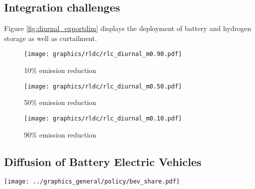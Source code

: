 \subsection{Integration challenges}


Figure \ref{fig:diurnal_exportdim} displays the deployment of battery and hydrogen storage as well as curtailment.

\begin{figure*}[t] %
    \centering
    \begin{subfigure}[b]{0.3\linewidth}
        \centering
        \texttt{[image: graphics/rldc/rlc\_diurnal\_m0.90.pdf]}
        \caption{10\% emission reduction}
        \label{fig:diurnal_10emred}
    \end{subfigure}
    \hfill
    \begin{subfigure}[b]{0.3\linewidth}
        \centering
        \texttt{[image: graphics/rldc/rlc\_diurnal\_m0.50.pdf]}
        \caption{50\% emission reduction}
        \label{fig:diurnal_50emred}
    \end{subfigure}
    \hfill
    \begin{subfigure}[b]{0.3\linewidth}
        \centering
        \texttt{[image: graphics/rldc/rlc\_diurnal\_m0.10.pdf]}
        \caption{90\% emission reduction}
        \label{fig:diurnal_90emred}
    \end{subfigure}
    \hfill
    \caption{Export dependent (0 - 200 TWh) residual load curves with various integration options. Each row represents different integration strategies (RLC without integration, RLC with curtailment, RLC with curtailment and electrolyser load).
    Each column represents different climate ambitions (10 - 90\% emission reduction)}
    \label{fig:diurnal_exportdim}
\end{figure*}

\subsection{Diffusion of Battery Electric Vehicles}

\begin{figure*}[t]
    \centering
    \texttt{[image: ../graphics\_general/policy/bev\_share.pdf]}
    \caption{Market diffusion of Battery Electricity Vehicles in Morocco, synthesized based on a s-curve with a growth rate $k=0.2$ and inflection point $x_0=2040$.}
    \label{fig:bev_diffusion}
\end{figure*}

